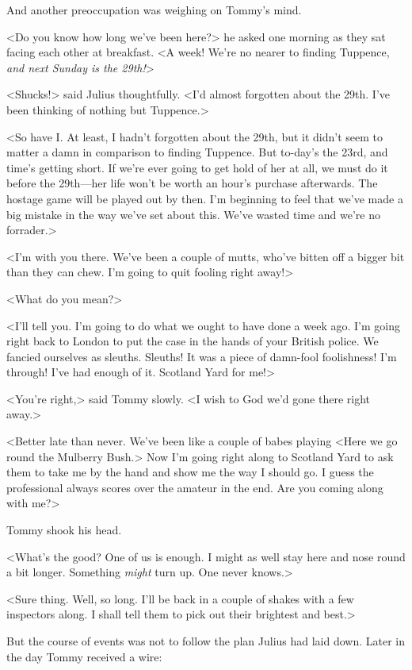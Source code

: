 And another preoccupation was weighing on Tommy's mind.

<Do you know how long we've been here?> he asked one morning as they sat facing each other at breakfast. <A week! We're no nearer to finding Tuppence, \emph{and next Sunday is the 29th!}>

<Shucks!> said Julius thoughtfully. <I'd almost forgotten about the 29th. I've been thinking of nothing but Tuppence.>

<So have I. At least, I hadn't forgotten about the 29th, but it didn't seem to matter a damn in comparison to finding Tuppence. But to-day's the 23rd, and time's getting short. If we're ever going to get hold of her at all, we must do it before the 29th—her life won't be worth an hour's purchase afterwards. The hostage game will be played out by then. I'm beginning to feel that we've made a big mistake in the way we've set about this. We've wasted time and we're no forrader.>

<I'm with you there. We've been a couple of mutts, who've bitten off a bigger bit than they can chew. I'm going to quit fooling right away!>

<What do you mean?>

<I'll tell you. I'm going to do what we ought to have done a week ago. I'm going right back to London to put the case in the hands of your British police. We fancied ourselves as sleuths. Sleuths! It was a piece of damn-fool foolishness! I'm through! I've had enough of it. Scotland Yard for me!>

<You're right,> said Tommy slowly. <I wish to God we'd gone there right away.>

<Better late than never. We've been like a couple of babes playing <Here we go round the Mulberry Bush.> Now I'm going right along to Scotland Yard to ask them to take me by the hand and show me the way I should go. I guess the professional always scores over the amateur in the end. Are you coming along with me?>

Tommy shook his head.

<What's the good? One of us is enough. I might as well stay here and nose round a bit longer. Something \emph{might} turn up. One never knows.>

<Sure thing. Well, so long. I'll be back in a couple of shakes with a few inspectors along. I shall tell them to pick out their brightest and best.>

But the course of events was not to follow the plan Julius had laid down. Later in the day Tommy received a wire:

